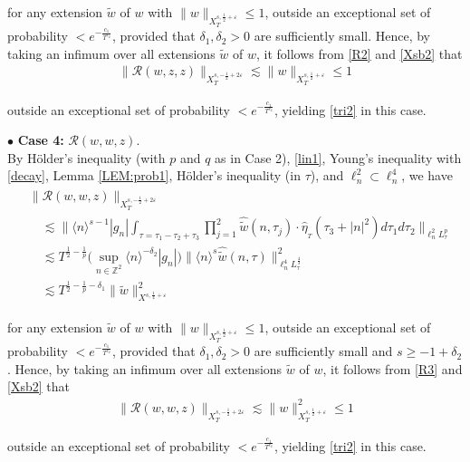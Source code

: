 \documentclass[%
11pt,  reqno]{amsart}
\DeclareMathOperator*{\intt}{\int}
\newcommand{\1}{\hspace{0.2mm}\text{I}\hspace{0.2mm}}
\newcommand{\noi}{\noindent}
\newcommand{\Z}{\mathbb{Z}}
\newcommand{\dl}{\delta}
\newcommand{\eps}{\varepsilon}
\newcommand{\ft}{\widehat}
\newcommand{\wt}{\widetilde}
\renewcommand{\l}{\ell}
\newcommand{\les}{\lesssim}
\newcommand{\jb}[1]
{\langle #1 \rangle}
\newcommand{\RR}{\mathcal{R}}
\numberwithin{equation}{section}
\numberwithin{theorem}{section}
\begin{document}
\noi 
for any extension   $\wt w$  of $w$ with  $\|w \|_{X^{s, \frac{1}{2}+\eps}_T} \leq 1$, 
outside an exceptional set of probability $< e^{-\frac{c_1}{T^{c_2}}}$, 
provided that $\dl_1, \dl_2 > 0$
are sufficiently small.
Hence, by taking an infimum over all extensions $\wt w$ of $w$, 
it follows from \eqref{R2} and \eqref{Xsb2} that 
\begin{align*}
 \|\RR(w, z, z)\|_{X^{s, -\frac 12 +2 \eps}_T} 
\les  \| w \|_{X^{s, \frac 12 + \eps}_T}
\le 1
\end{align*}

\noi
outside an exceptional set of probability $< e^{-\frac{c_1}{T^{c_2}}}$, 
yielding 
\eqref{tri2} in this case.


\medskip

\noi $\bullet$ {\bf Case 4:}
$\RR(w, w, z)$.
\\ \indent
By H\"older's inequality (with $p$ and $q$ as in Case 2),
 \eqref{lin1}, 
 Young's inequality with \eqref{decay},  Lemma \ref{LEM:prob1}, 
H\"older's inequality (in $\tau$), 
and  $\l^2_n \subset \l^4_n$,
we have 
\begin{align}
\begin{split}
&  \|\RR(w, w, z)\|_{X^{s, -\frac 12 +2 \eps}_T}  \\
 &\quad  \les
\bigg\| \jb{n}^{s-1} |g_n| \intt_{\tau = \tau_1 - \tau_2 + \tau_3}
\prod_{j = 1}^2 \ft {\wt w}(n, \tau_j) 
\cdot  \ft \eta_{_T}(\tau_3 + |n|^2)d\tau_1 d\tau_2 \bigg\|_{\l^2_{n} L^p_\tau}\\
& \quad \les
T^{\frac{1}{2}-\frac 1p} 
\Big(\sup_{n \in \Z^2} \jb{n}^{-\dl_2} |g_n|\Big)
\| \jb{n}^s \ft{\wt{w}} (n, \tau)\|_{\l^4_n L^\frac{4}{3}_\tau}^2 \\
& \quad
\les T^{\frac{1}{2}-\frac 1p - \dl_1}
\|\wt w \|_{X^{s, \frac{1}{4}+\eps}}^2
\end{split}
\label{R3}
\end{align}

\noi 
for any extension   $\wt w$  of $w$ with  $\|w \|_{X^{s, \frac{1}{2}+\eps}_T} \leq 1$, 
outside an exceptional set of probability $< e^{-\frac{c_1}{T^{c_2}}}$, 
provided that $\dl_1, \dl_2 > 0$
are sufficiently small
and $s \ge -1+\dl_2$.
Hence, by taking an infimum over all extensions $\wt w$ of $w$, 
it follows from \eqref{R3} and \eqref{Xsb2} that 
\begin{align*}
 \|\RR(w, w, z)\|_{X^{s, -\frac 12 +2 \eps}_T} 
\les  \| w \|_{X^{s, \frac 12 + \eps}_T}^2
\le 1
\end{align*}

\noi
outside an exceptional set of probability $< e^{-\frac{c_1}{T^{c_2}}}$, 
yielding 
\eqref{tri2} in this case.
\end{document}
